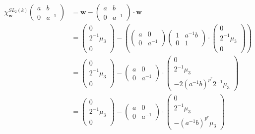 \begin{align*}
	\chi^{SL_2(k)}_\mathbf{w}\left(\begin{matrix}a & b\\0 & a^{-1}\end{matrix}\right) &= \mathbf{w} - \left(\begin{matrix}a & b\\0 & a^{-1}\end{matrix}\right) \cdot \mathbf{w} \\
	&=
	\left(\begin{matrix}0\\2^{-1}\mu_3\\0\end{matrix}\right)
	-\left(
	\left(\begin{matrix}a & 0\\0 & a^{-1}\end{matrix}\right)
	\left(\begin{matrix}1 & a^{-1}b\\0 & 1\end{matrix}\right)\cdot
	\left(\begin{matrix}0\\2^{-1}\mu_3\\0\end{matrix}\right)
	\right)\\
	&=
	\left(\begin{matrix}0\\2^{-1}\mu_3\\0\end{matrix}\right)
	-
	\left(\begin{matrix}a & 0\\0 & a^{-1}\end{matrix}\right)\cdot
	\left(\begin{matrix}0\\2^{-1}\mu_3\\-2(a^{-1}b)^{p^r}2^{-1}\mu_3\end{matrix}\right) \\
	&=
	\left(\begin{matrix}0\\2^{-1}\mu_3\\0\end{matrix}\right)
	-
	\left(\begin{matrix}a & 0\\0 & a^{-1}\end{matrix}\right)\cdot
	\left(\begin{matrix}0\\2^{-1}\mu_3\\-(a^{-1}b)^{p^r}\mu_3\end{matrix}\right) \\

\end{align*}
